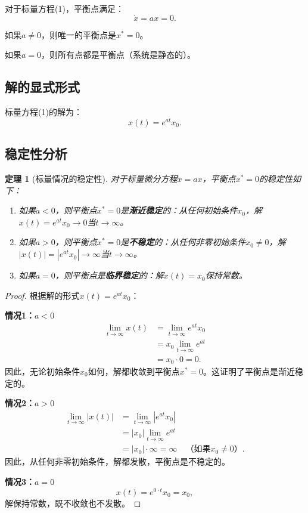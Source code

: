 \documentclass[12pt,a4paper]{article}
\newtheorem{theorem}{定理}
\newtheorem{proof}{证明}
\begin{document}
对于标量方程(1)，平衡点满足：
\begin{equation}
\dot{x} = ax = 0.
\end{equation}

如果$a \neq 0$，则唯一的平衡点是$x^* = 0$。

如果$a = 0$，则所有点都是平衡点（系统是静态的）。

\subsection{解的显式形式}

标量方程(1)的解为：
\begin{equation}
x(t) = e^{at}x_0.
\end{equation}

\subsection{稳定性分析}

\begin{theorem}[标量情况的稳定性]
对于标量微分方程$\dot{x} = ax$，平衡点$x^* = 0$的稳定性如下：
\begin{enumerate}
\item 如果$a < 0$，则平衡点$x^* = 0$是\textbf{渐近稳定}的：从任何初始条件$x_0$，解$x(t) = e^{at}x_0 \to 0$当$t \to \infty$。
\item 如果$a > 0$，则平衡点$x^* = 0$是\textbf{不稳定}的：从任何非零初始条件$x_0 \neq 0$，解$|x(t)| = |e^{at}x_0| \to \infty$当$t \to \infty$。
\item 如果$a = 0$，则平衡点是\textbf{临界稳定}的：解$x(t) = x_0$保持常数。
\end{enumerate}
\end{theorem}

\begin{proof}
根据解的形式$x(t) = e^{at}x_0$：

\textbf{情况1：$a < 0$}
\begin{align}
\lim_{t \to \infty} x(t) &= \lim_{t \to \infty} e^{at}x_0 \\
&= x_0 \lim_{t \to \infty} e^{at} \\
&= x_0 \cdot 0 = 0.
\end{align}
因此，无论初始条件$x_0$如何，解都收敛到平衡点$x^* = 0$。这证明了平衡点是渐近稳定的。

\textbf{情况2：$a > 0$}
\begin{align}
\lim_{t \to \infty} |x(t)| &= \lim_{t \to \infty} |e^{at}x_0| \\
&= |x_0| \lim_{t \to \infty} e^{at} \\
&= |x_0| \cdot \infty = \infty \quad \text{（如果$x_0 \neq 0$）}.
\end{align}
因此，从任何非零初始条件，解都发散，平衡点是不稳定的。

\textbf{情况3：$a = 0$}
\begin{equation}
x(t) = e^{0 \cdot t}x_0 = x_0,
\end{equation}
解保持常数，既不收敛也不发散。
\end{proof}
\end{document}
